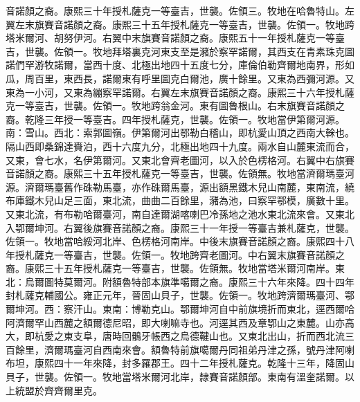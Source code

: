 \begin{pinyinscope}
音諾顏之裔。康熙三十年授札薩克一等臺吉，世襲。佐領三。牧地在哈魯特山。左翼左末旗賽音諾顏之裔。康熙三十五年授札薩克一等臺吉，世襲。佐領一。牧地跨塔米爾河、胡努伊河。右翼中末旗賽音諾顏之裔。康熙五十一年授札薩克一等臺吉，世襲。佐領一。牧地拜塔裏克河東支至是瀦於察罕諾爾，其西支在青素珠克圖諾們罕游牧諾爾，當西十度、北極出地四十五度七分，庫倫伯勒齊爾地南界，形如瓜，周百里，東西長，諾爾東有呼里圖克白爾池，廣十餘里。又東為西彌河源。又東為一小河，又東為繃察罕諾爾。右翼左末旗賽音諾顏之裔。康熙三十六年授札薩克一等臺吉，世襲。佐領一。牧地跨翁金河。東有圖魯根山。右末旗賽音諾顏之裔。乾隆三年授一等臺吉。四年授札薩克，世襲。佐領一。牧地當伊第爾河源。南：雪山。西北：索郭圖嶺。伊第爾河出鄂勒白稽山，即杭愛山頂之西南大榦也。隔山西即桑錦達賚泊，西十六度九分，北極出地四十九度。兩水自山麓東流而合，又東，會七水，名伊第爾河。又東北會齊老圖河，以入於色楞格河。右翼中右旗賽音諾顏之裔。康熙三十五年授札薩克一等臺吉，世襲。佐領無。牧地當濟爾瑪臺河源。濟爾瑪臺舊作硃勒馬臺，亦作硃爾馬臺，源出額黑鐵木兒山南麓，東南流，繞布庫鐵木兒山足三面，東北流，曲曲二百餘里，瀦為池，曰察罕鄂模，廣數十里。又東北流，有布勒哈爾臺河，南自達爾湖喀喇巴冷孫地之池水東北流來會。又東北入鄂爾坤河。右翼後旗賽音諾顏之裔。康熙三十一年授一等臺吉兼札薩克，世襲。佐領一。牧地當哈綏河北岸、色楞格河南岸。中後末旗賽音諾顏之裔。康熙四十八年授札薩克一等臺吉，世襲。佐領一。牧地跨齊老圖河。中右翼末旗賽音諾顏之裔。康熙三十五年授札薩克一等臺吉，世襲。佐領無。牧地當塔米爾河南岸。東北：烏爾圖特莫爾河。附額魯特部本旗準噶爾之裔。康熙三十六年來降。四十四年封札薩克輔國公。雍正元年，晉固山貝子，世襲。佐領一。牧地跨濟爾瑪臺河、鄂爾坤河。西：察汗山。東南：博勒克山。鄂爾坤河自中前旗境折而東北，逕西爾哈阿濟爾罕山西麓之額爾德尼昭，即大喇嘛寺也。河逕其西及章鄂山之東麓。山亦高大，即杭愛之東支阜，唐時回鶻牙帳西之烏德鞬山也。又東北出山，折而西北流三百餘里，濟爾瑪臺河自西南來會。額魯特前旗噶爾丹同祖弟丹津之孫，號丹津阿喇布坦，康熙四十一年來降，封多羅郡王。四十二年授札薩克。乾隆十三年，降固山貝子，世襲。佐領一。牧地當塔米爾河北岸，隸賽音諾顏部。東南有溫奎諾爾。以上統盟於齊齊爾里克。


\end{pinyinscope}
